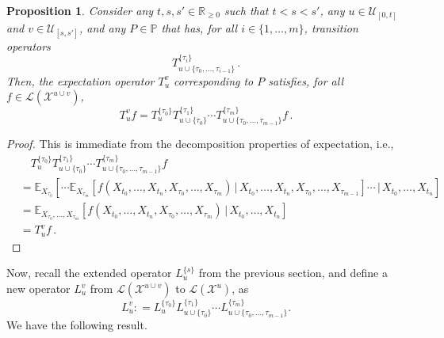 \documentclass[a4paper,reqno]{amsart}
\newtheorem{proposition}[theorem]{Proposition}
\newcommand{\reals}{\mathbb{R}}
\newcommand{\realsnonneg}{\reals_{\geq 0}}
\newcommand{\states}{\mathcal{X}}
\newcommand{\gambles}{\mathcal{L}}
\newcommand{\coloneqq}{:\!=}
\begin{document}
\begin{proposition}\label{proposition:nonmarkov_multi_variable_decompose}
Consider any $t,s,s'\in\realsnonneg$ such that $t<s<s'$, any $u\in\mathcal{U}_{[0,t]}$ and $v\in\mathcal{U}_{[s,s']}$, and any $P\in\mathbb{P}$ that has, for all $i\in\{1,\ldots,m\}$, transition operators
\begin{equation*}
T_{u\cup\{\tau_0,\ldots,\tau_{i-1}\}}^{\{\tau_i\}}\,.
\end{equation*}
Then, the expectation operator $T_u^v$ corresponding to $P$ satisfies, for all $f\in\gambles(\states^{u\cup v})$,
\begin{equation*}
T_u^v f = T_u^{\{\tau_0\}}T_{u\cup\{\tau_0\}}^{\{\tau_1\}}\cdots T_{u\cup\{\tau_0,\ldots,\tau_{m-1}\}}^{\{\tau_m\}} f\,.
\end{equation*}
\end{proposition}
\begin{proof}
This is immediate from the decomposition properties of expectation, i.e.,
\begin{align*}
&\quad T_u^{\{\tau_0\}}T_{u\cup\{\tau_0\}}^{\{\tau_1\}}\cdots T_{u\cup\{\tau_0,\ldots,\tau_{m-1}\}}^{\{\tau_m\}} f \\
 &= \mathbb{E}_{X_{\tau_0}}\left[\cdots\mathbb{E}_{X_{\tau_m}}\left[f(X_{t_0},\ldots,X_{t_n},X_{\tau_0},\ldots,X_{\tau_m})\,\vert\,X_{t_0},\ldots,X_{t_n},X_{\tau_0},\ldots,X_{\tau_{m-1}}\right]\cdots\,\vert\,X_{t_0},\ldots,X_{t_n}\right] \\
 &= \mathbb{E}_{X_{\tau_0},\ldots,X_{\tau_m}}\left[f(X_{t_0},\ldots,X_{t_n},X_{\tau_0},\ldots,X_{\tau_m})\,\vert\,X_{t_0},\ldots,X_{t_n}\right] \\
 &= T_u^v f\,.
\end{align*}
\end{proof}

Now, recall the extended operator $L_u^{\{s\}}$ from the previous section, and define a new operator $L_u^v$ from $\gambles(\states^{u\cup v})$ to $\gambles(\states^u)$, as
\begin{equation*}
L_u^v \coloneqq L_u^{\{\tau_0\}}L_{u\cup\{\tau_0\}}^{\{\tau_1\}}\cdots L_{u\cup\{\tau_0,\ldots,\tau_{m-1}\}}^{\{\tau_m\}}.
\end{equation*}
We have the following result.
\end{document}
